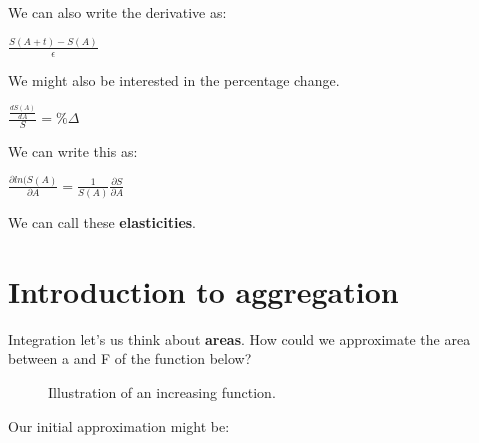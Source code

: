 \documentclass[12pt]{article}
\begin{document}
We can also write the derivative as:

\( \frac{S(A+t)-S(A)}{\epsilon} \)

We might also be interested in the percentage change. 

\( \frac{\frac{dS(A)}{dA}}{S}= \% \Delta\)

We can write this as:

\( \frac{\partial ln(S(A)}{\partial A}= \frac{1}{S(A)} \frac{\partial S}{ \partial A} \)

We can call these \textbf{elasticities}. 

\section{Introduction to aggregation}

Integration let's us think about \textbf{areas}. How could we approximate the area between a and F of the function below?

\begin{figure}[h!]
\centering


\caption{Illustration of an increasing function.}
\label{fig:increasing_function}

\end{figure}

Our initial approximation might be:
\end{document}
